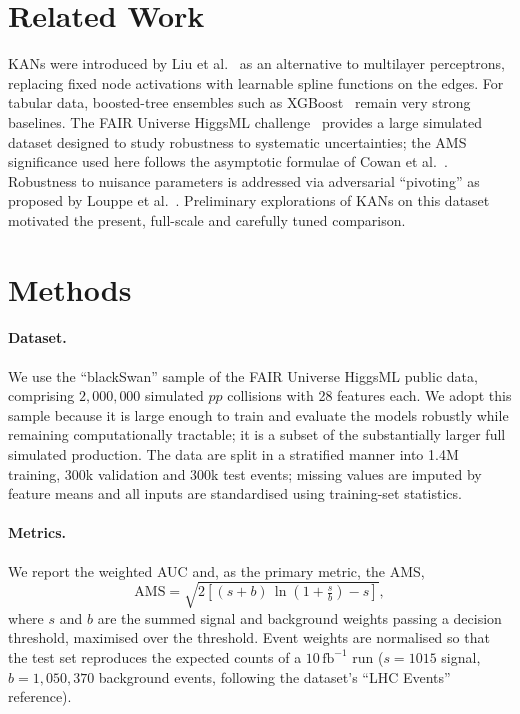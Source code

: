 \documentclass[11pt]{article}
\begin{document}
\section{Related Work}
KANs were introduced by Liu et al.~\cite{liu2024kan,liu2024kan2} as an alternative to
multilayer perceptrons, replacing fixed node activations with learnable spline functions on
the edges. For tabular data, boosted-tree ensembles such as XGBoost~\cite{chen2016xgboost}
remain very strong baselines. The FAIR Universe HiggsML challenge~\cite{fairuniverse} provides
a large simulated dataset designed to study robustness to systematic uncertainties; the AMS
significance used here follows the asymptotic formulae of Cowan et al.~\cite{cowan2011}.
Robustness to nuisance parameters is addressed via adversarial ``pivoting'' as proposed by
Louppe et al.~\cite{louppe2017}. Preliminary explorations of KANs on this dataset motivated the
present, full-scale and carefully tuned comparison.

\section{Methods}
\paragraph{Dataset.} We use the ``blackSwan'' sample of the FAIR Universe HiggsML public data,
comprising $2{,}000{,}000$ simulated $pp$ collisions with 28 features each. We adopt this
sample because it is large enough to train and evaluate the models robustly while remaining
computationally tractable; it is a subset of the substantially larger full simulated
production. The data are split in a stratified manner into 1.4M training, 300k validation and
300k test events; missing values are imputed by feature means and all inputs are standardised
using training-set statistics.

\paragraph{Metrics.} We report the weighted AUC and, as the primary metric, the AMS,
\begin{equation}
\mathrm{AMS}=\sqrt{2\left[(s+b)\,\ln\!\left(1+\tfrac{s}{b}\right)-s\right]},
\end{equation}
where $s$ and $b$ are the summed signal and background weights passing a decision threshold,
maximised over the threshold. Event weights are normalised so that the test set reproduces the
expected counts of a $10\,\mathrm{fb}^{-1}$ run ($s=1015$ signal, $b=1{,}050{,}370$
background events, following the dataset's ``LHC Events'' reference).
\end{document}
